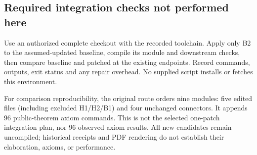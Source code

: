 \subsection{Required integration checks not performed here}
Use an authorized complete checkout with the recorded toolchain. Apply only B2 to the assumed-updated baseline, compile its module and downstream checks, then compare baseline and patched  at the existing endpoints. Record commands, outputs, exit status and any repair overhead. No supplied script installs or fetches this environment.

For comparison reproducibility, the original route orders nine modules: five edited files (including excluded H1/H2/B1) and four unchanged connectors. It appends 96 public-theorem axiom commands. This is not the selected one-patch integration plan, nor 96 observed axiom results. All new candidates remain uncompiled; historical receipts and PDF rendering do not establish their elaboration, axioms, or performance.
